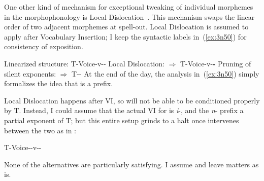 \begin{exe}
\begin{xlist}
\begin{xlist}
\begin{exe}
\begin{xlist}
\begin{xlist}
\begin{exe}
\begin{xlist}
\begin{xlist}
\begin{exe}
\begin{exe}
\begin{xlist}
\begin{exe}
\begin{exe}
\begin{xlist}
\begin{exe}
\begin{exe}
\begin{exe}
\begin{exe}
\begin{exe}
\begin{xlist}
\begin{exe}
\begin{xlist}
\begin{exe}
\begin{exe}
\begin{xlist}
\begin{exe}
\begin{xlist}
\begin{exe}
\begin{xlist}
\begin{exe}
\begin{exe}
\begin{exe}
\begin{xlist}
\begin{exe}
\begin{exe}
\begin{exe}
\begin{xlist}
\begin{exe}
\begin{xlist}
\begin{exe}
\begin{xlist}
\begin{exe}
\begin{xlist}
\begin{exe}
\begin{exe}
\begin{exe}
\begin{exe}
\begin{xlist}
\begin{exe}
\begin{xlist}
\begin{exe}
\begin{xlist}
\begin{exe}
\begin{xlist}
\begin{exe}
\begin{xlist}
\begin{exe}
\begin{xlist}
\begin{exe}
\begin{exe}
\begin{exe}
\begin{exe}
\begin{xlist}
\begin{exe}
\begin{xlist}
One other kind of mechanism for exceptional tweaking of individual morphemes in the morphophonology is Local Dislocation~\citep{embicknoyer01}. This mechanism swaps the linear order of two adjacent morphemes at spell-out. Local Dislocation is assumed to apply after Vocabulary Insertion; I keep the syntactic labels in~(\ref{ex:3n50}) for consistency of exposition.
 \begin{exe}
 \ex  \label{ex:3n50}
 \begin{xlist} 
 	\ex  Linearized structure: 
		T-Voice-v--\pz
 	\ex  Local Dislocation: 
		$\Rightarrow$ T-Voice-v-\textbf{\pz-}
 	\ex  Pruning of silent exponents: 
		$\Rightarrow$ T-\pz-
 \z
\z 
At the end of the day, the analysis in~(\ref{ex:3n50}) simply formalizes the idea that {\pz} is a prefix.

Local Dislocation happens after VI, so {\pz} will not be able to be conditioned properly by T. Instead, I could assume that the actual VI for {\pz} is \emph{i}-, and the \emph{n}- prefix a partial exponent of T; but this entire setup grinds to a halt once {\va} intervenes between the two as in {\thit}:
 \begin{exe}
\ex  T-Voice-{\va}-v-\pz- 
 \z 

None of the alternatives are particularly satisfying. I assume  and leave matters as is.



\end{exe}
\end{xlist}
\end{exe}
\end{xlist}
\end{exe}
\end{xlist}
\end{exe}
\end{exe}
\end{exe}
\end{exe}
\end{xlist}
\end{exe}
\end{xlist}
\end{exe}
\end{xlist}
\end{exe}
\end{xlist}
\end{exe}
\end{xlist}
\end{exe}
\end{xlist}
\end{exe}
\end{exe}
\end{exe}
\end{exe}
\end{xlist}
\end{exe}
\end{xlist}
\end{exe}
\end{xlist}
\end{exe}
\end{xlist}
\end{exe}
\end{exe}
\end{exe}
\end{xlist}
\end{exe}
\end{exe}
\end{exe}
\end{xlist}
\end{exe}
\end{xlist}
\end{exe}
\end{xlist}
\end{exe}
\end{exe}
\end{xlist}
\end{exe}
\end{xlist}
\end{exe}
\end{exe}
\end{exe}
\end{exe}
\end{exe}
\end{xlist}
\end{exe}
\end{exe}
\end{xlist}
\end{exe}
\end{exe}
\end{xlist}
\end{xlist}
\end{exe}
\end{xlist}
\end{xlist}
\end{exe}
\end{xlist}
\end{xlist}
\end{exe}

